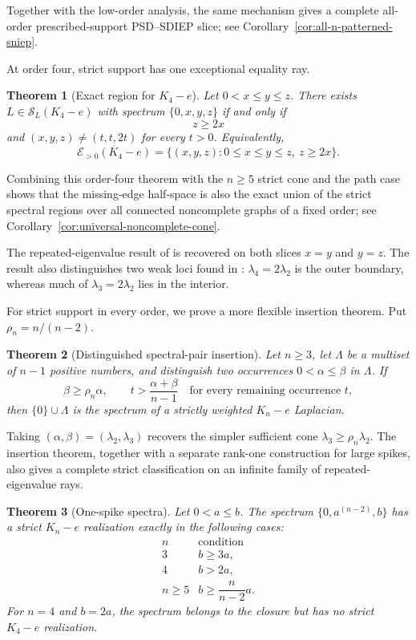 \documentclass[11pt,reqno]{amsart}
\newtheorem{theorem}{Theorem}[section]
\theoremstyle{definition}
\theoremstyle{remark}
\newcommand{\SL}{\mathcal S_L}
\begin{document}
Together with the low-order analysis, the same mechanism gives a complete
all-order prescribed-support PSD--SDIEP slice; see
Corollary~\ref{cor:all-n-patterned-sniep}.

At order four, strict support has one exceptional equality ray.

\begin{theorem}[Exact region for $K_4-e$]\label{thm:k4-exact-intro}
Let $0<x\le y\le z$.  There exists $L\in\SL(K_4-e)$ with spectrum
$\{0,x,y,z\}$ if and only if
\[
  z\ge2x
\]
and $(x,y,z)\ne(t,t,2t)$ for every $t>0$.  Equivalently,
\[
  \overline{\mathcal E_{>0}(K_4-e)}
  =\{(x,y,z):0\le x\le y\le z,\ z\ge2x\}.
\]
\end{theorem}

Combining this order-four theorem with the $n\ge5$ strict cone and the path
case shows that the missing-edge half-space is also the exact union of the
strict spectral regions over all connected noncomplete graphs of a fixed
order; see Corollary~\ref{cor:universal-noncomplete-cone}.

The repeated-eigenvalue result of \cite{FGL2025} is recovered on both slices
$x=y$ and $y=z$.  The result also distinguishes two weak loci found in
\cite{CFGL2026}: $\lambda_4=2\lambda_2$ is the outer boundary, whereas much of
$\lambda_3=2\lambda_2$ lies in the interior.

For strict support in every order, we prove a more flexible insertion theorem.
Put $\rho_n=n/(n-2)$.

\begin{theorem}[Distinguished spectral-pair insertion]
\label{thm:spectral-pair-insertion-intro}
Let $n\ge3$, let $\Lambda$ be a multiset of $n-1$ positive numbers, and
distinguish two occurrences $0<\alpha\le\beta$ in $\Lambda$.  If
\[
  \beta\ge\rho_n\alpha,
  \qquad
  t>\frac{\alpha+\beta}{n-1}
  \quad\text{for every remaining occurrence }t,
\]
then $\{0\}\cup\Lambda$ is the spectrum of a strictly weighted
$K_n-e$ Laplacian.
\end{theorem}

Taking $(\alpha,\beta)=(\lambda_2,\lambda_3)$ recovers the simpler sufficient
cone $\lambda_3\ge\rho_n\lambda_2$.  The insertion theorem, together with a
separate rank-one construction for large spikes, also gives a complete strict
classification on an infinite family of repeated-eigenvalue rays.

\begin{theorem}[One-spike spectra]\label{thm:intro-one-spike}
Let $0<a\le b$.  The spectrum $\{0,a^{(n-2)},b\}$ has a strict
$K_n-e$ realization exactly in the following cases:
\[
\begin{array}{c|c}
 n&\text{condition}\\ \hline
 3&b\ge3a,\\
 4&b>2a,\\
 n\ge5&b\ge\dfrac{n}{n-2}a.
\end{array}
\]
For $n=4$ and $b=2a$, the spectrum belongs to the closure but has no strict
$K_4-e$ realization.
\end{theorem}
\end{document}
